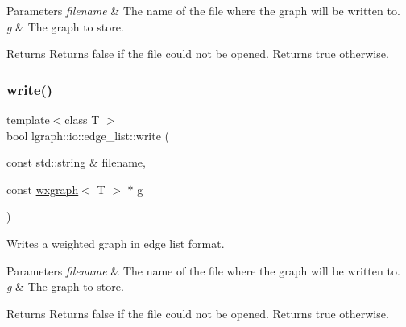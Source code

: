 \begin{DoxyParams}{Parameters}
{\em filename} & The name of the file where the graph will be written to. \\
\hline
{\em g} & The graph to store. \\
\hline
\end{DoxyParams}
\begin{DoxyReturn}{Returns}
Returns false if the file could not be opened. Returns true otherwise. 
\end{DoxyReturn}
\mbox{\label{namespacelgraph_1_1io_1_1edge__list_ae422e4d5062831a958585527065208e7}} 
\subsubsection{\texorpdfstring{write()}{write()}\hspace{0.1cm}{\footnotesize\ttfamily [2/4]}}
{\footnotesize\ttfamily template$<$class T $>$ \\
bool lgraph\+::io\+::edge\+\_\+list\+::write (\begin{DoxyParamCaption}\item[{const std\+::string \&}]{filename,  }\item[{const \hyperlink{classlgraph_1_1wxgraph}{wxgraph}$<$ T $>$ $\ast$}]{g }\end{DoxyParamCaption})}



Writes a weighted graph in edge list format. 


\begin{DoxyParams}{Parameters}
{\em filename} & The name of the file where the graph will be written to. \\
\hline
{\em g} & The graph to store. \\
\hline
\end{DoxyParams}
\begin{DoxyReturn}{Returns}
Returns false if the file could not be opened. Returns true otherwise. 
\end{DoxyReturn}
\mbox{\label{namespacelgraph_1_1io_1_1edge__list_aed1aa537146bbb2f4f2308a04ec12ff6}} 

